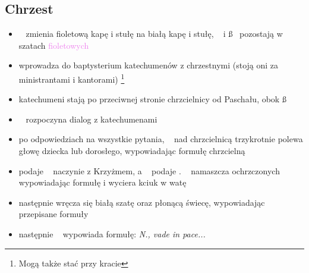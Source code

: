 \subsection{Chrzest}
\begin{itemize}
	\item \ii~ zmienia {\color{violet} fioletową kapę i stułę} na
	      \textcolor{black!50}{białą kapę i stułę}, \dd~ i \ss~ pozostają w
	      szatach \textcolor{violet}{fioletowych}
	\item {} wprowadza do baptysterium katechumenów z chrzestnymi (stoją oni
	      za ministrantami i kantorami) \footnote{Mogą także stać przy kracie}
	\item katechumeni stają po przeciwnej stronie chrzcielnicy od Paschału, obok
	      \ss
	\item \ii~ rozpoczyna dialog z katechumenami
	\item po odpowiedziach na wszystkie pytania, \ii~ nad chrzcielnicą
	      trzykrotnie polewa głowę dziecka lub dorosłego, wypowiadając formułę
	      chrzcielną
	\item {} podaje \dd~ naczynie z Krzyżmem, a \dd~ podaje \ii. \ii~
	      namaszcza ochrzczonych wypowiadając formułę i wyciera kciuk w watę
	\item następnie wręcza się białą szatę oraz płonącą świecę, wypowiadając
	      przepisane formuły
	\item następnie \ii~ wypowiada formułę: \textit{N., vade in pace...}
\end{itemize}
